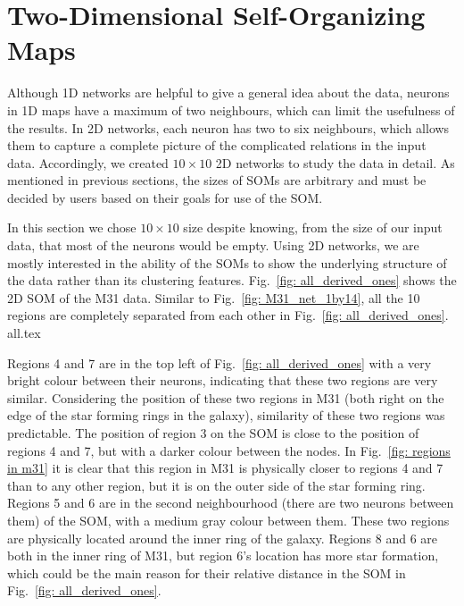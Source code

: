 \section{Two-Dimensional Self-Organizing Maps}
 \label{sec: 2d_cluster}
    Although 1D networks are helpful to give a general idea about the data, neurons in 1D maps have a maximum of two neighbours, which can limit the usefulness of the results.
    In 2D networks, each neuron has two to six neighbours, which allows them to capture a complete picture of the complicated relations in the input data.
    Accordingly, we created $10\times10$ 2D networks to study the data in detail.
    As mentioned in previous sections, the sizes of SOMs are arbitrary and must be decided by users based on their goals for use of the SOM.
    
    In this section we chose $10\times10$ size despite knowing, from the size of our input data, that most of the neurons would be empty.
    Using 2D networks, we are mostly interested in the ability of the SOMs to show the underlying structure of the data rather than its clustering features.
    Fig.~\ref{fig: all_derived_ones} shows the 2D SOM of the M31 data.
    Similar to Fig.~\ref{fig: M31_net_1by14}, all the 10 regions are completely separated from each other in Fig.~\ref{fig: all_derived_ones}.
    {all.tex}
    
    Regions 4 and 7 are in the top left of Fig.~\ref{fig: all_derived_ones} with a very bright colour between their neurons, indicating that these two regions are very similar.
    Considering the position of these two regions in M31 (both right on the edge of the star forming rings in the galaxy), similarity of these two regions was predictable.
    The position of region 3 on the SOM is close to the position of regions 4 and 7, but with a darker colour between the nodes. 
    In Fig.~\ref{fig: regions in m31} it is clear that this region in M31 is physically closer to regions 4 and 7 than to any other region, but it is on the outer side of the star forming ring.
    Regions 5 and 6 are in the second neighbourhood (there are two neurons between them) of the SOM, with a medium gray colour between them.
    These two regions are physically located around the inner ring of the galaxy.
    Regions 8 and 6 are both in the inner ring of M31, but region 6's location has more star formation, which could be the main reason for their relative distance in the SOM in Fig.~\ref{fig: all_derived_ones}. 
    
